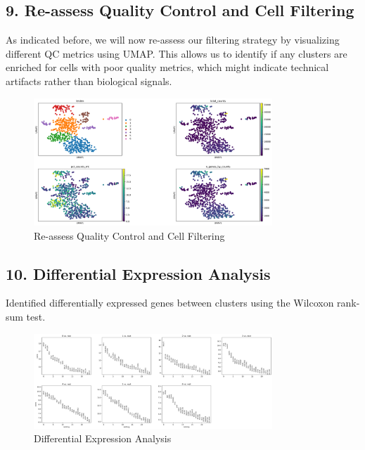 \documentclass[12pt]{article}
\begin{document}
\subsection{9. Re-assess Quality Control and Cell Filtering}
As indicated before, we will now re-assess our filtering strategy by visualizing different QC metrics using UMAP. This allows us to identify if any clusters are enriched for cells with poor quality metrics, which might indicate technical artifacts rather than biological signals.

\begin{figure}[H]
    \centering
    \includegraphics[width=0.8\textwidth]{umap_qc.png}
    \caption{Re-assess Quality Control and Cell Filtering}
    \label{fig:umap_qc}
\end{figure}

\subsection{10. Differential Expression Analysis}
Identified differentially expressed genes between clusters using the Wilcoxon rank-sum test.

\begin{figure}[H]
    \centering
    \includegraphics[width=0.8\textwidth]{de.png}
    \caption{Differential Expression Analysis}
    \label{fig:de}
\end{figure}
\end{document}
